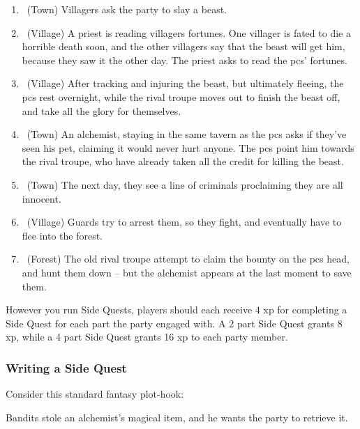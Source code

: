 \begin{multicols}{2}
\begin{enumerate}

  \item
  \sqr~(Town)
  Villagers ask the party to slay a beast.
  \item
  \sqr~(Village)
  A priest is reading villagers fortunes.
  One villager is fated to die a horrible death soon, and the other villagers say that the beast will get him, because they saw it the other day.
  The priest asks to read the \glspl{pc}' fortunes.
  \item
  \sqr~(Village)
  After tracking and injuring the beast, but ultimately fleeing, the \glspl{pc} rest overnight, while the rival troupe moves out to finish the beast off, and take all the glory for themselves.
  \item
  \sqr~(Town)
  An alchemist, staying in the same tavern as the \glspl{pc} asks if they've seen his pet, claiming it would never hurt anyone.
  The \glspl{pc} point him towards the rival troupe, who have already taken all the credit for killing the beast.
  \item
  \sqr~(Town)
  The next day, they see a line of criminals proclaiming they are all innocent.
  \item
  \sqr~(Village)
  Guards try to arrest them, so they fight, and eventually have to flee into the forest.
  \item
  \sqn~(Forest)
  The old rival troupe attempt to claim the bounty on the \glspl{pc} head, and hunt them down -- but the alchemist appears at the last moment to save them.

\end{enumerate}

However you run Side Quests, players should each receive 4 \gls{xp} for completing a Side Quest for each part the party engaged with.
A 2 part Side Quest grants 8 \gls{xp}, while a 4 part Side Quest grants 16 \gls{xp} to each party member.

\subsubsection{Writing a Side Quest}

Consider this standard fantasy plot-hook:

\begin{exampletext}

  Bandits stole an alchemist's magical item, and he wants the party to retrieve it.

\end{exampletext}


\end{multicols}

